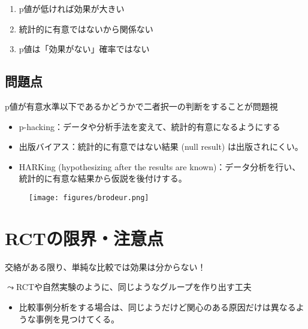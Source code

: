 \documentclass[
  xelatex,
  ja=standard]{bxjsarticle}
\providecommand{\tightlist}{%
  \setlength{\itemsep}{0pt}\setlength{\parskip}{0pt}}\usepackage{longtable,booktabs,array}
\begin{document}
\begin{enumerate}
\def\labelenumi{\arabic{enumi}.}
\tightlist
\item
  p値が低ければ効果が大きい
\item
  統計的に有意ではないから関係ない
\item
  p値は「効果がない」確率ではない
\end{enumerate}

\hypertarget{ux554fux984cux70b9}{%
\subsection{問題点}\label{ux554fux984cux70b9}}

p値が有意水準以下であるかどうかで二者択一の判断をすることが問題視

\begin{itemize}
\tightlist
\item
  p-hacking：データや分析手法を変えて、統計的有意になるようにする
\item
  出版バイアス：統計的に有意ではない結果 (null result)
  は出版されにくい。
\item
  HARKing (hypothesizing after the results are
  known)：データ分析を行い、統計的に有意な結果から仮説を後付けする。
\end{itemize}

\begin{figure}[htpb]

{\centering \texttt{[image: figures/brodeur.png]}

}

\caption{\citet{brodeur2020}}

\end{figure}

\hypertarget{rctux306eux9650ux754cux6ce8ux610fux70b9}{%
\section{RCTの限界・注意点}\label{rctux306eux9650ux754cux6ce8ux610fux70b9}}

交絡がある限り、単純な比較では効果は分からない！

\(\leadsto\)RCTや自然実験のように、同じようなグループを作り出す工夫

\begin{itemize}
\tightlist
\item
  比較事例分析をする場合は、同じようだけど関心のある原因だけは異なるような事例を見つけてくる。
\end{itemize}
\end{document}
